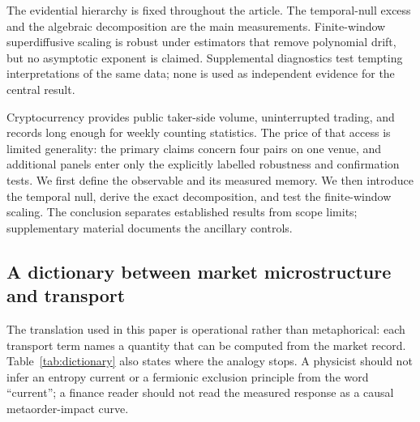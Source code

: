 \documentclass[aps,pre,twocolumn,superscriptaddress,floatfix,nofootinbib]{revtex4-2}
\begin{document}
The evidential hierarchy is fixed throughout the article. The temporal-null
excess and the algebraic decomposition are the main measurements. Finite-window
superdiffusive scaling is robust under estimators that remove polynomial drift,
but no asymptotic exponent is claimed. Supplemental diagnostics test tempting
interpretations of the same data; none is used as independent evidence for the
central result.

Cryptocurrency provides public taker-side volume, uninterrupted trading, and
records long enough for weekly counting statistics. The price of that access
is limited generality: the primary claims concern four pairs on one venue, and
additional panels enter only the explicitly labelled robustness and
confirmation tests. We first define the observable and its measured memory.
We then introduce the temporal null, derive the exact decomposition, and test
the finite-window scaling. The conclusion separates established results from
scope limits; supplementary material documents the ancillary controls.

\subsection*{A dictionary between market microstructure and transport}

The translation used in this paper is operational rather than metaphorical:
each transport term names a quantity that can be computed from the market
record. Table~\ref{tab:dictionary} also states where the analogy stops. A
physicist should not infer an entropy current or a fermionic exclusion principle
from the word ``current''; a finance reader should not read the measured
response as a causal metaorder-impact curve.
\end{document}
